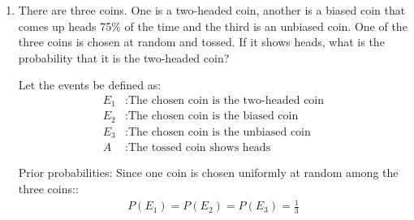 \begin{enumerate}[label=\thesubsection.\arabic*, ref=\thesubsection.\theenumi]
The feasible region bounded by the coordinate axes and the lines is the convex polygon $OABC$ with vertices:
\begin{align*}
	O(0, 0), \quad A(3, 0), \quad B(2, 3), \quad C(0, 4)
\end{align*}

Corner points and objective function evaluation:
Evaluating $Z = 40x + 50y$ at each extreme point:

At $O(0, 0)$:
\begin{align*}
	Z = 40(0) + 50(0) = 0
\end{align*}

At $A(3, 0)$:
\begin{align*}
	Z = 40(3) + 50(0) = 120
\end{align*}

At $B(2, 3)$:
\begin{align*}
	Z = 40(2) + 50(3) = 80 + 150 = 230
\end{align*}

At $C(0, 4)$:
\begin{align*}
	Z = 40(0) + 50(4) = 200
\end{align*}

Conclusion:
The maximum value of $Z$ is Rs.~$230$, which occurs at the corner point $(2, 3)$.
Hence, the company should produce $2$ units of type A and $3$ units of type B to obtain a maximum profit of Rs.~$230$.


\item There are three coins. One is a two-headed coin, another is a biased coin that comes up heads 75\% of the time and the third is an unbiased coin. One of the three coins is chosen at random and tossed. If it shows heads, what is the probability that it is the two-headed coin?

\solution
Let the events be defined as:
\begin{align*}
	E_1 &: \text{The chosen coin is the two-headed coin} \\
	E_2 &: \text{The chosen coin is the biased coin} \\
	E_3 &: \text{The chosen coin is the unbiased coin} \\
	A &: \text{The tossed coin shows heads}
\end{align*}

Prior probabilities:
Since one coin is chosen uniformly at random among the three coins::
\begin{align*}
	P(E_1) = P(E_2) = P(E_3) = \frac{1}{3}
\end{align*}


\end{enumerate}
